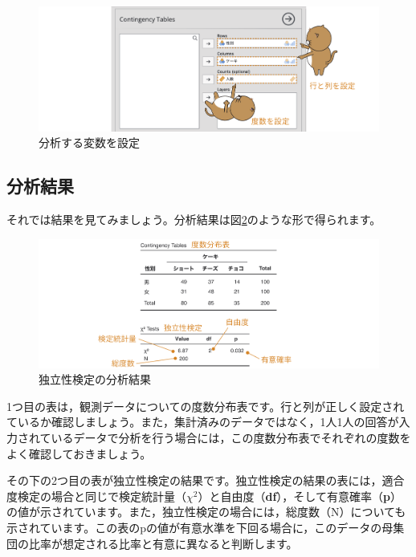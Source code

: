 \documentclass[
  12pt,
  a5jpaper,
  lualatex, ja=standard]{bxjsbook}
\begin{document}
\begin{figure}[!ht]

{\centering \includegraphics[width=1\linewidth]{images/frequencies/chisq-setvar} 

}

\caption{分析する変数を設定}\label{fig:frequencies-chisq-setvar}
\end{figure}

\hypertarget{sub:frequencies-chisq-results}{%
\subsection{分析結果}\label{sub:frequencies-chisq-results}}

それでは結果を見てみましょう。分析結果は図\ref{fig:frequencies-chisq-results}のような形で得られます。

\begin{figure}[!ht]

{\centering \includegraphics[width=1\linewidth]{images/frequencies/chisq-results} 

}

\caption{独立性検定の分析結果}\label{fig:frequencies-chisq-results}
\end{figure}

1つ目の表は，観測データについての度数分布表です。行と列が正しく設定されているか確認しましょう。また，集計済みのデータではなく，1人1人の回答が入力されているデータで分析を行う場合には，この度数分布表でそれぞれの度数をよく確認しておきましょう。

その下の2つ目の表が独立性検定の結果です。独立性検定の結果の表には，適合度検定の場合と同じで検定統計量（\(\chi^2\)）と自由度（\textbf{df}），そして有意確率（\textbf{p}）の値が示されています。また，独立性検定の場合には，総度数（N）についても示されています。この表のpの値が有意水準を下回る場合に，このデータの母集団の比率が想定される比率と有意に異なると判断します。
\end{document}

